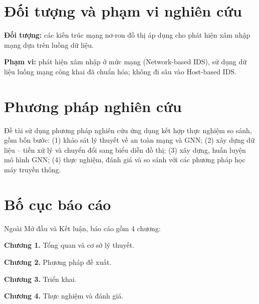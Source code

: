 \section*{Đối tượng và phạm vi nghiên cứu}

\textbf{Đối tượng:} các kiến trúc mạng nơ-ron đồ thị áp dụng cho phát hiện xâm nhập mạng dựa trên luồng dữ liệu.

\textbf{Phạm vi:} phát hiện xâm nhập ở mức mạng (Network-based IDS), sử dụng dữ liệu luồng mạng công khai đã chuẩn hóa; không đi sâu vào Host-based IDS.

\section*{Phương pháp nghiên cứu}

Đề tài sử dụng phương pháp nghiên cứu ứng dụng kết hợp thực nghiệm so sánh, gồm bốn bước: (1) khảo sát lý thuyết về an toàn mạng và GNN; (2) xây dựng dữ liệu -- tiền xử lý và chuyển đổi sang biểu diễn đồ thị; (3) xây dựng, huấn luyện mô hình GNN; (4) thực nghiệm, đánh giá và so sánh với các phương pháp học máy truyền thống.

\section*{Bố cục báo cáo}

Ngoài Mở đầu và Kết luận, báo cáo gồm 4 chương:

\textbf{Chương 1.} Tổng quan và cơ sở lý thuyết.

\textbf{Chương 2.} Phương pháp đề xuất.

\textbf{Chương 3.} Triển khai.

\textbf{Chương 4.} Thực nghiệm và đánh giá.